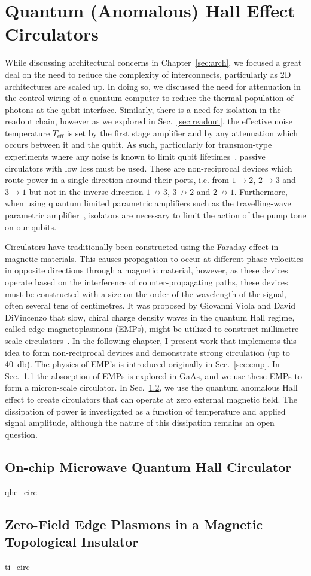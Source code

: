\chapter{Quantum (Anomalous) Hall Effect Circulators}
\label{sec:hall}

While discussing architectural concerns in Chapter~\ref{sec:arch}, we focused a great deal on the need to reduce the complexity of interconnects,
particularly as 2D architectures are scaled up. In doing so, we discussed the need for attenuation in the control wiring of a quantum computer
to reduce the thermal population of photons at the qubit interface. Similarly, there is a need for isolation in the readout chain, however
as we explored in Sec.~\ref{sec:readout}, the effective noise temperature $T_\textrm{eff}$ is set by the first stage amplifier and by any attenuation
which occurs between it and the qubit. As such, particularly for transmon-type experiments where any noise is known to limit qubit
lifetimes~\cite{PhysRevLett.101.080502}, passive circulators with low loss must be used. These are non-reciprocal devices which route power
in a single direction around their ports, i.e. from $1 \to 2$, $2 \to 3$ and $3 \to 1$ but not in the inverse direction $1 \not\to 3$, $3 \not\to 2$
and $2 \not\to 1$. Furthermore, when using quantum limited parametric amplifiers such as the travelling-wave parametric amplifier~\cite{PhysRevLett.113.157001},
isolators are necessary to limit the action of the pump tone on our qubits.

Circulators have traditionally been constructed using the Faraday effect in magnetic materials. This causes propagation to occur at different phase
velocities in opposite directions through a magnetic material, however, as these devices operate based on the interference of counter-propagating paths,
these devices must be constructed with a size on the order of the wavelength of the signal, often several tens of centimetres. It was proposed by
Giovanni Viola and David DiVincenzo that slow, chiral charge density waves in the quantum Hall regime, called edge magnetoplasmons (EMPs), might be utilized to
construct millimetre-scale circulators~\cite{PhysRevX.4.021019}. In the following chapter, I present work that implements this idea to form non-reciprocal
devices and demonstrate strong circulation (up to \SI{40}{\decibel}). The physics of EMP's is introduced originally in Sec.~\ref{sec:emp}. In Sec.~\ref{sec:hallcirc} the
absorption of EMPs is explored in GaAs, and we use these EMPs to form a micron-scale circulator. In Sec.~\ref{sec:spinhallcirc}, we use the quantum anomalous Hall
effect to create circulators that can operate at zero external magnetic field. The dissipation of power is investigated as a function of temperature and applied signal
amplitude, although the nature of this dissipation remains an open question.

\clearpage
\section{On-chip Microwave Quantum Hall Circulator}
\label{sec:hallcirc}
{qhe_circ}

\clearpage
\section{Zero-Field Edge Plasmons in a Magnetic Topological Insulator}
\label{sec:spinhallcirc}
{ti_circ}

